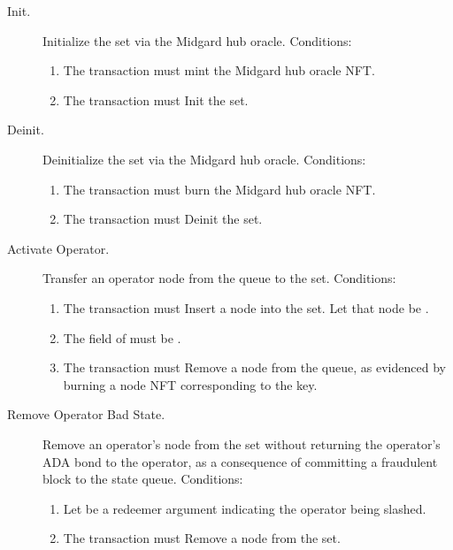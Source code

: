 \documentclass[../midgard.tex]{subfiles}
\begin{document}
\begin{description}
    \item[Init.] Initialize the  set via the Midgard hub oracle.
      Conditions:
        \begin{enumerate}
            \item The transaction must mint the Midgard hub oracle NFT.
            \item The transaction must Init the  set.
        \end{enumerate}
    \item[Deinit.] Deinitialize the  set via the Midgard hub oracle.
      Conditions:
        \begin{enumerate}
            \item The transaction must burn the Midgard hub oracle NFT.
            \item The transaction must Deinit the  set.
        \end{enumerate}
    \item[Activate Operator.] Transfer an operator node from the  queue to the  set.
      Conditions:
        \begin{enumerate}
            \item The transaction must Insert a node into the  set.
              Let that node be .
            \item The  field of  must be .
            \item The transaction must Remove a node from the  queue, as evidenced by burning a  node NFT corresponding to the  key.
        \end{enumerate}
    \item[Remove Operator Bad State.] Remove an operator's node from the  set without returning the operator's ADA bond to the operator, as a consequence of committing a fraudulent block to the state queue.
      Conditions:
        \begin{enumerate}
            \item Let  be a redeemer argument indicating the operator being slashed.
            \item The transaction must Remove a node from the  set.

\end{enumerate}
\end{description}
\end{document}
